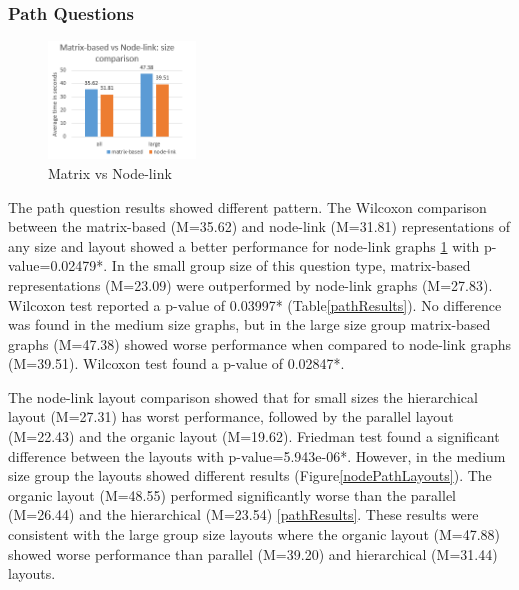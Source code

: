 \documentclass{l4proj}
\begin{document}
\subsubsection{Path Questions}


\begin{figure}
	\centering
	\vspace{-10mm}
    \includegraphics[width=0.35\textwidth]{images/pathComparison.PNG}
    \caption{Matrix vs Node-link} 
	\label{pathComparison}
\end{figure}

The path question results showed different pattern. The Wilcoxon comparison between the matrix-based (M=35.62) and node-link (M=31.81) representations of any size and layout showed a better performance for node-link graphs \ref{pathComparison} with p-value=0.02479*. In the small group size of this question type, matrix-based representations (M=23.09) were outperformed by node-link graphs (M=27.83). Wilcoxon test reported a p-value of 0.03997* (Table\ref{pathResults}). No difference was found in the medium size graphs, but in the large size group matrix-based graphs (M=47.38) showed worse performance when compared to node-link graphs (M=39.51). Wilcoxon test found a p-value of 0.02847*. 



The node-link layout comparison showed that for small sizes the hierarchical layout (M=27.31) has worst performance, followed by the parallel layout (M=22.43) and the organic layout (M=19.62). Friedman test found a significant difference between the layouts with p-value=5.943e-06*. However, in the medium size group the layouts showed different results (Figure\ref{nodePathLayouts}). The organic layout (M=48.55) performed significantly worse than the parallel (M=26.44) and the hierarchical (M=23.54) \ref{pathResults}. These results were consistent with the large group size layouts where the organic layout (M=47.88) showed worse performance than parallel (M=39.20) and hierarchical (M=31.44) layouts.
\end{document}
